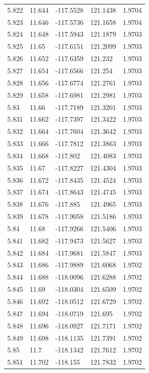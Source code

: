 \begin{tabular}{lllll}
5.822 & 11.644 & -117.5528 & 121.1438 & 1.9704 \\
5.823 & 11.646 & -117.5736 & 121.1658 & 1.9704 \\
5.824 & 11.648 & -117.5943 & 121.1879 & 1.9703 \\
5.825 & 11.65 & -117.6151 & 121.2099 & 1.9703 \\
5.826 & 11.652 & -117.6359 & 121.232 & 1.9703 \\
5.827 & 11.654 & -117.6566 & 121.254 & 1.9703 \\
5.828 & 11.656 & -117.6774 & 121.2761 & 1.9703 \\
5.829 & 11.658 & -117.6981 & 121.2981 & 1.9703 \\
5.83 & 11.66 & -117.7189 & 121.3201 & 1.9703 \\
5.831 & 11.662 & -117.7397 & 121.3422 & 1.9703 \\
5.832 & 11.664 & -117.7604 & 121.3642 & 1.9703 \\
5.833 & 11.666 & -117.7812 & 121.3863 & 1.9703 \\
5.834 & 11.668 & -117.802 & 121.4083 & 1.9703 \\
5.835 & 11.67 & -117.8227 & 121.4304 & 1.9703 \\
5.836 & 11.672 & -117.8435 & 121.4524 & 1.9703 \\
5.837 & 11.674 & -117.8643 & 121.4745 & 1.9703 \\
5.838 & 11.676 & -117.885 & 121.4965 & 1.9703 \\
5.839 & 11.678 & -117.9058 & 121.5186 & 1.9703 \\
5.84 & 11.68 & -117.9266 & 121.5406 & 1.9703 \\
5.841 & 11.682 & -117.9473 & 121.5627 & 1.9703 \\
5.842 & 11.684 & -117.9681 & 121.5847 & 1.9703 \\
5.843 & 11.686 & -117.9889 & 121.6068 & 1.9702 \\
5.844 & 11.688 & -118.0096 & 121.6288 & 1.9702 \\
5.845 & 11.69 & -118.0304 & 121.6509 & 1.9702 \\
5.846 & 11.692 & -118.0512 & 121.6729 & 1.9702 \\
5.847 & 11.694 & -118.0719 & 121.695 & 1.9702 \\
5.848 & 11.696 & -118.0927 & 121.7171 & 1.9702 \\
5.849 & 11.698 & -118.1135 & 121.7391 & 1.9702 \\
5.85 & 11.7 & -118.1342 & 121.7612 & 1.9702 \\
5.851 & 11.702 & -118.155 & 121.7832 & 1.9702 \\

\end{tabular}
